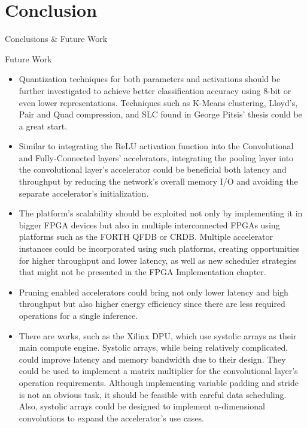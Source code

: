 \setlength{\parskip}{\baselineskip}
\section{Conclusion}

\begin{frame}
	\huge Conclusions \& Future Work
\end{frame}

\begin{frame}{Future Work}
	\begin{itemize}
		\item Quantization techniques for both parameters and activations should be further investigated to achieve better classification accuracy using 8-bit or even lower representations. Techniques such as K-Means clustering, Lloyd's, Pair and Quad compression, and SLC found in George Pitsis' thesis could be a great start.
		\item Similar to integrating the ReLU activation function into the Convolutional and Fully-Connected layers' accelerators, integrating the pooling layer into the convolutional layer's accelerator could be beneficial both latency and throughput by reducing the network's overall memory I/O and avoiding the separate accelerator's initialization.
		\item The platform's scalability should be exploited not only by implementing it in bigger FPGA devices but also in multiple interconnected FPGAs using platforms such as the FORTH QFDB or CRDB. Multiple accelerator instances could be incorporated using such platforms, creating opportunities for higher throughput and lower latency, as well as new scheduler strategies that might not be presented in the FPGA Implementation chapter.
		\item Pruning enabled accelerators could bring not only lower latency and high throughput but also higher energy efficiency since there are less required operations for a single inference.
		\item There are works, such as the Xilinx DPU, which use systolic arrays as their main compute engine. Systolic arrays, while being relatively complicated, could improve latency and memory bandwidth due to their design. They could be used to implement a matrix multiplier for the convolutional layer's operation requirements. Although implementing variable padding and stride is not an obvious task, it should be feasible with careful data scheduling. Also, systolic arrays could be designed to implement n-dimensional convolutions to expand the accelerator's use cases.

\end{itemize}
\end{frame}
